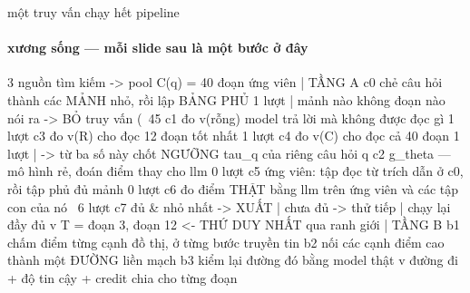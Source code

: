 \documentclass[aspectratio=169,10pt]{beamer}
\begin{document}
\begin{frame}[fragile]{một truy vấn chạy hết pipeline}
  \framesubtitle{xương sống — mỗi slide sau là một bước ở đây}
\begin{dia}
        3 nguồn tìm kiếm  ->  pool C(q) = 40 đoạn ứng viên
           |
TẦNG A  c0   chẻ câu hỏi thành các MẢNH nhỏ, rồi lập BẢNG PHỦ          1 lượt
           |      mảnh nào không đoạn nào nói ra  ->  BỎ truy vấn       (~45%
        c1   đo v(rỗng)   model trả lời mà không được đọc gì            1 lượt
        c3   đo v(R)      cho đọc 12 đoạn tốt nhất                      1 lượt
        c4   đo v(C)      cho đọc cả 40 đoạn                            1 lượt
           |      ->  từ ba số này chốt NGƯỠNG tau_q của riêng câu hỏi q
        c2   g_theta — mô hình rẻ, đoán điểm thay cho llm               0 lượt
        c5   ứng viên: tập đọc từ trích dẫn ở c0, rồi tập phủ đủ mảnh   0 lượt
        c6   đo điểm THẬT bằng llm trên ứng viên và các tập con của nó ~6 lượt
        c7   đủ & nhỏ nhất -> XUẤT  |  chưa đủ -> thử tiếp  |  chạy lại đầy đủ
           v
        T = {đoạn 3, đoạn 12}              <-  THỨ DUY NHẤT qua ranh giới
           |
TẦNG B  b1   chấm điểm từng cạnh đồ thị, ở từng bước truyền tin
        b2   nối các cạnh điểm cao thành một ĐƯỜNG liền mạch
        b3   kiểm lại đường đó bằng model thật
           v
        đường đi  +  độ tin cậy  +  credit chia cho từng đoạn
\end{dia}
\end{frame}
\end{document}
